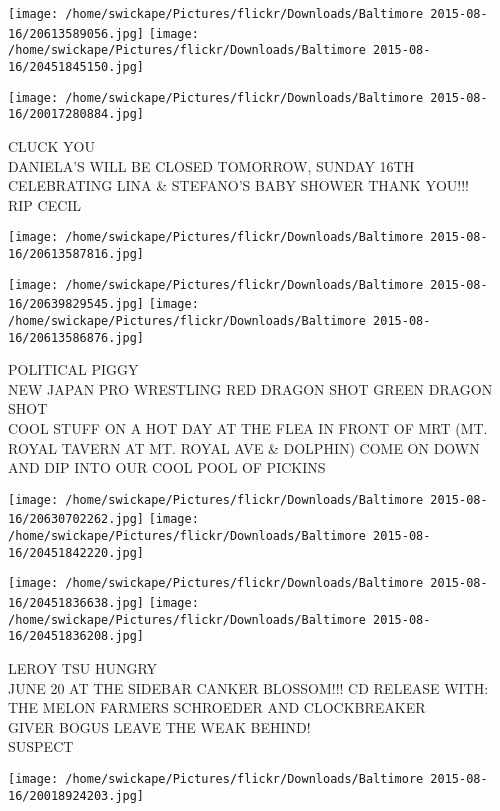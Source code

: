 \documentclass[10pt,letterpaper]{article}
\begin{document}
\texttt{[image: /home/swickape/Pictures/flickr/Downloads/Baltimore 2015-08-16/20613589056.jpg]}
\texttt{[image: /home/swickape/Pictures/flickr/Downloads/Baltimore 2015-08-16/20451845150.jpg]}

\vspace{0.25in}
\texttt{[image: /home/swickape/Pictures/flickr/Downloads/Baltimore 2015-08-16/20017280884.jpg]}

CLUCK YOU\\
DANIELA'S WILL BE CLOSED TOMORROW, SUNDAY 16TH CELEBRATING LINA \& STEFANO'S BABY SHOWER THANK YOU!!!\\
RIP CECIL
\pagebreak

\texttt{[image: /home/swickape/Pictures/flickr/Downloads/Baltimore 2015-08-16/20613587816.jpg]}

\vspace{0.25in}
\texttt{[image: /home/swickape/Pictures/flickr/Downloads/Baltimore 2015-08-16/20639829545.jpg]}
\texttt{[image: /home/swickape/Pictures/flickr/Downloads/Baltimore 2015-08-16/20613586876.jpg]}

POLITICAL PIGGY\\
NEW JAPAN PRO WRESTLING RED DRAGON SHOT GREEN DRAGON SHOT\\
COOL STUFF ON A HOT DAY AT THE FLEA IN FRONT OF MRT (MT. ROYAL TAVERN AT MT. ROYAL AVE \& DOLPHIN) COME ON DOWN AND DIP INTO OUR COOL POOL OF PICKINS
\pagebreak

\texttt{[image: /home/swickape/Pictures/flickr/Downloads/Baltimore 2015-08-16/20630702262.jpg]}
\texttt{[image: /home/swickape/Pictures/flickr/Downloads/Baltimore 2015-08-16/20451842220.jpg]}

\texttt{[image: /home/swickape/Pictures/flickr/Downloads/Baltimore 2015-08-16/20451836638.jpg]}
\texttt{[image: /home/swickape/Pictures/flickr/Downloads/Baltimore 2015-08-16/20451836208.jpg]}

LEROY TSU HUNGRY\\
JUNE 20 AT THE SIDEBAR CANKER BLOSSOM!!! CD RELEASE WITH: THE MELON FARMERS SCHROEDER AND CLOCKBREAKER\\
GIVER BOGUS LEAVE THE WEAK BEHIND!\\
SUSPECT
\pagebreak

\texttt{[image: /home/swickape/Pictures/flickr/Downloads/Baltimore 2015-08-16/20018924203.jpg]}
\end{document}
